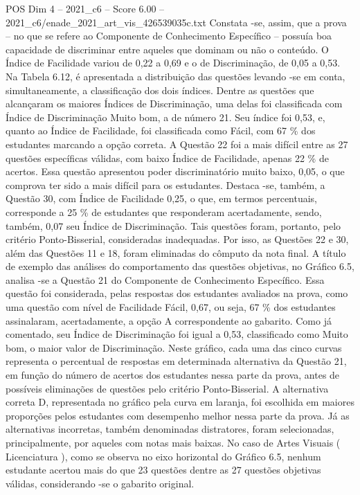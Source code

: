 \begin{textsample}{POS Dim 4 – 2021\_c6 – Score 6.00 – 2021\_c6/enade\_2021\_art\_vis\_426539035c.txt}
Constata -se, assim, que a prova – no que se refere ao Componente de Conhecimento Específico – possuía boa capacidade de discriminar entre aqueles que dominam ou não o conteúdo.
O Índice de Facilidade variou de 0,22 a 0,69 e o de Discriminação, de 0,05 a 0,53.
Na Tabela 6.12, é apresentada a distribuição das questões levando -se em conta, simultaneamente, a classificação dos dois índices.
Dentre as questões que alcançaram os maiores Índices de Discriminação, uma delas foi classificada com Índice de Discriminação Muito bom, a de número 21.
Seu índice foi 0,53, e, quanto ao Índice de Facilidade, foi classificada como Fácil, com 67 \% dos estudantes marcando a opção correta.
A Questão 22 foi a mais difícil entre as 27 questões específicas válidas, com baixo Índice de Facilidade, apenas 22 \% de acertos.
Essa questão apresentou poder discriminatório muito baixo, 0,05, o que comprova ter sido a mais difícil para os estudantes.
Destaca -se, também, a Questão 30, com Índice de Facilidade 0,25, o que, em termos percentuais, corresponde a 25 \% de estudantes que responderam acertadamente, sendo, também, 0,07 seu Índice de Discriminação.
Tais questões foram, portanto, pelo critério Ponto-Bisserial, consideradas inadequadas.
Por isso, as Questões 22 e 30, além das Questões 11 e 18, foram eliminadas do cômputo da nota final.
A título de exemplo das análises do comportamento das questões objetivas, no Gráfico 6.5, analisa -se a Questão 21 do Componente de Conhecimento Específico.
Essa questão foi considerada, pelas respostas dos estudantes avaliados na prova, como uma questão com nível de Facilidade Fácil, 0,67, ou seja, 67 \% dos estudantes assinalaram, acertadamente, a opção A correspondente ao gabarito.
Como já comentado, seu Índice de Discriminação foi igual a 0,53, classificado como Muito bom, o maior valor de Discriminação.
Neste gráfico, cada uma das cinco curvas representa o percentual de respostas em determinada alternativa da Questão 21, em função do número de acertos dos estudantes nessa parte da prova, antes de possíveis eliminações de questões pelo critério Ponto-Bisserial.
A alternativa correta D, representada no gráfico pela curva em laranja, foi escolhida em maiores proporções pelos estudantes com desempenho melhor nessa parte da prova.
Já as alternativas incorretas, também denominadas distratores, foram selecionadas, principalmente, por aqueles com notas mais baixas.
No caso de Artes Visuais ( Licenciatura ), como se observa no eixo horizontal do Gráfico 6.5, nenhum estudante acertou mais do que 23 questões dentre as 27 questões objetivas válidas, considerando -se o gabarito original.

\end{textsample}

